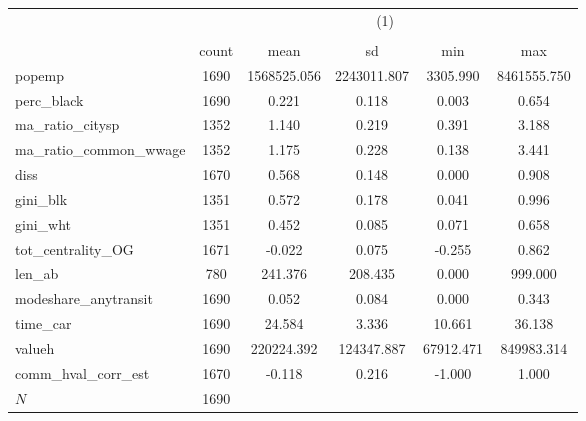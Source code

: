 {
\def\sym#1{\ifmmode^{#1}\else\(^{#1}\)\fi}
\begin{tabular}{l*{1}{ccccc}}
\toprule
            &\multicolumn{5}{c}{(1)}                                         \\
            &\multicolumn{5}{c}{}                                            \\
            &       count&        mean&          sd&         min&         max\\
\midrule
popemp      &        1690& 1568525.056& 2243011.807&    3305.990& 8461555.750\\
perc\_black  &        1690&       0.221&       0.118&       0.003&       0.654\\
ma\_ratio\_citysp&        1352&       1.140&       0.219&       0.391&       3.188\\
ma\_ratio\_common\_wwage&        1352&       1.175&       0.228&       0.138&       3.441\\
diss        &        1670&       0.568&       0.148&       0.000&       0.908\\
gini\_blk    &        1351&       0.572&       0.178&       0.041&       0.996\\
gini\_wht    &        1351&       0.452&       0.085&       0.071&       0.658\\
tot\_centrality\_OG&        1671&      -0.022&       0.075&      -0.255&       0.862\\
len\_ab      &         780&     241.376&     208.435&       0.000&     999.000\\
modeshare\_anytransit&        1690&       0.052&       0.084&       0.000&       0.343\\
time\_car    &        1690&      24.584&       3.336&      10.661&      36.138\\
valueh      &        1690&  220224.392&  124347.887&   67912.471&  849983.314\\
comm\_hval\_corr\_est&        1670&      -0.118&       0.216&      -1.000&       1.000\\
\midrule
\(N\)       &        1690&            &            &            &            \\
\bottomrule
\end{tabular}
}
